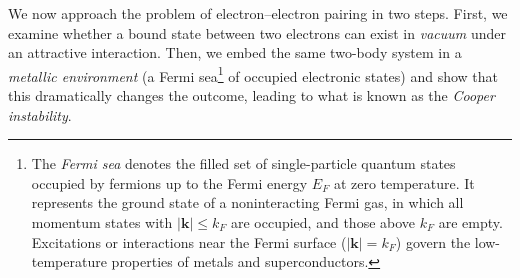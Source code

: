 We now approach the problem of electron–electron pairing in two steps.  
First, we examine whether a bound state between two electrons can exist in \emph{vacuum} under an attractive interaction.  
Then, we embed the same two-body system in a \emph{metallic environment} (a Fermi sea\footnote{The \textit{Fermi sea} denotes the filled set of single-particle quantum states occupied by fermions up to the Fermi energy \(E_F\) at zero temperature.  
It represents the ground state of a noninteracting Fermi gas, in which all momentum states with \(|\mathbf{k}| \leq k_F\) are occupied, and those above \(k_F\) are empty.  
Excitations or interactions near the Fermi surface (\(|\mathbf{k}| = k_F\)) govern the low-temperature properties of metals and superconductors.%
} of occupied electronic states) and show that this dramatically changes the outcome, leading to what is known as the \textit{Cooper instability}.  

